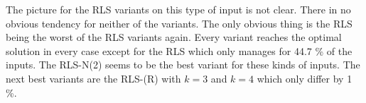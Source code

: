 The picture for the RLS variants on this type of input is not clear.
There in no obvious tendency for neither of the variants.
The only obvious thing is the RLS being the worst of the RLS variants again.
Every variant reaches the optimal solution in every case except for the RLS which only manages for 44.7 \% of the inputs.
The RLS-N(2) seems to be the best variant for these kinds of inputs.
The next best variants are the RLS-(R) with $k=3$ and $k=4$ which only differ by 1 \%.
